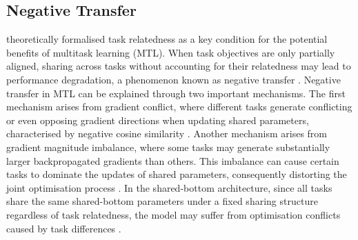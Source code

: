 \subsection{Negative Transfer}
\citet{BenDavid2008TaskRelatedness} theoretically formalised task relatedness as a key condition for the potential benefits of multitask learning (MTL). When task objectives are only partially aligned, sharing across tasks without accounting for their relatedness may lead to performance degradation, a phenomenon known as negative transfer \citep{pmlr-v48-leeb16, Wang2019NegativeTransfer}. Negative transfer in MTL can be explained through two important mechanisms. The first mechanism arises from gradient conflict, where different tasks generate conflicting or even opposing gradient directions when updating shared parameters, characterised by negative cosine similarity \citep{Yu2020PCGrad}. Another mechanism arises from gradient magnitude imbalance, where some tasks may generate substantially larger backpropagated gradients than others. This imbalance can cause certain tasks to dominate the updates of shared parameters, consequently distorting the joint optimisation process \citep{Chen2018GradNorm}. In the shared-bottom architecture, since all tasks share the same shared-bottom parameters under a fixed sharing structure regardless of task relatedness, the model may suffer from optimisation conflicts caused by task differences \citep{Ma2018MMoE}. 





